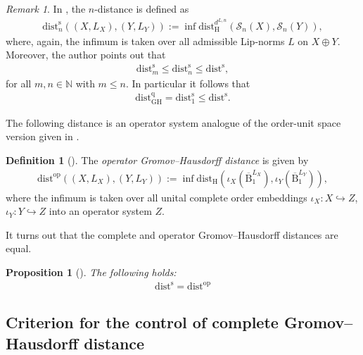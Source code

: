 \documentclass{amsart}
\theoremstyle{plain}
\newtheorem{proposition}[theorem]{Proposition}
\theoremstyle{definition}
\newtheorem{definition}[theorem]{Definition}
\theoremstyle{remark}
\newtheorem{remark}[theorem]{Remark}
\begin{document}
	\begin{remark}\label{rmk:Comparison-complete-qGH-distance}
		In \cite[Definition 3.2]{Ker03}, the $n$-distance is defined as
		\begin{align}
			\mathrm{dist}_n^\mathrm{s} ((X,L_X),(Y,L_Y))
			:= \inf \mathrm{dist}_\mathrm{H}^{d^{L,n}}(\mathcal{S}_n(X),\mathcal{S}_n(Y)),
		\end{align}
		where, again, the infimum is taken over all admissible Lip-norms $L$ on $X \oplus Y$.
		Moreover, the author points out that 
		\begin{align}
			\mathrm{dist}_m^\mathrm{s} 
			\leq \mathrm{dist}_n^\mathrm{s}
			\leq \mathrm{dist}^\mathrm{s},
		\end{align}
		for all $m, n \in \mathbb{N}$ with $m \leq n$.
		In particular it follows that
		\begin{align}
			\mathrm{dist}_\mathrm{GH}^\mathrm{q}
			= \mathrm{dist}_1^\mathrm{s}
			\leq \mathrm{dist}^\mathrm{s}.
		\end{align}
	\end{remark}
	
	The following distance is an operator system analogue of the order-unit space version given in \cite{Li06}.
	
	\begin{definition}[\cite{KL07}]
		The \emph{operator Gromov--Hausdorff distance} is given by
		\begin{align}
			\mathrm{dist}^\mathrm{op}((X,L_X),(Y,L_Y))
			:= \inf \mathrm{dist}_\mathrm{H}(\iota_X(\overline{\mathrm{B}}_1^{L_X}), \iota_Y(\overline{\mathrm{B}}_1^{L_Y})),
		\end{align}
		where the infimum is taken over all unital complete order embeddings $\iota_X : X \hookrightarrow Z$, $\iota_Y : Y \hookrightarrow Z$ into an operator system $Z$.
	\end{definition}
	
	It turns out that the complete and operator Gromov--Hausdorff distances are equal.
	
	\begin{proposition}[{\cite[Theorem 3.7]{KL07}}]\label{prop:Equality-complete-operator-GH-distance}
		The following holds:
		\begin{align}
			\mathrm{dist}^\mathrm{s}
			= \mathrm{dist}^\mathrm{op}
		\end{align}
	\end{proposition}
	
	
	
	\subsection{Criterion for the control of complete Gromov--Hausdorff distance}
	
\end{document}
